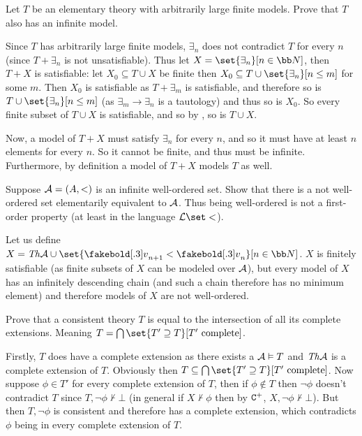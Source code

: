 \bexerc

    Let $T$ be an elementary theory with arbitrarily large finite models.
    Prove that $T$ also has an infinite model.

\eexerc

Since $T$ has arbitrarily large finite models, $\exists_n$ does not contradict $T$ for every $n$ (since $T+\exists_n$ is not unsatisfiable).
Thus let $X=\set{\exists_n}[n\in{\bb N}]$, then $T+X$ is satisfiable: let $X_0\subseteq T\cup X$ be finite then $X_0\subseteq T\cup\set{\exists_n}[n\leq m]$ for some $m$.
Then $X_0$ is satisfiable as $T+\exists_m$ is satisfiable, and therefore so is $T\cup\set{\exists_n}[n\leq m]$ (as $\exists_m\to\exists_n$ is a tautology) and thus so is $X_0$.
So every finite subset of $T\cup X$ is satisfiable, and so by , so is $T\cup X$.

Now, a model of $T+X$ must satisfy $\exists_n$ for every $n$, and so it must have at least $n$ elements for every $n$.
So it cannot be finite, and thus must be infinite.
Furthermore, by definition a model of $T+X$ models $T$ as well.

\bexerc

    Suppose ${\cal A}=(A,<)$ is an infinite well-ordered set.
    Show that there is a not well-ordered set elementarily equivalent to ${\cal A}$.
    Thus being well-ordered is not a first-order property (at least in the language ${\cal L}\set<$).

\eexerc

Let us define $X=\Th{\cal A}\cup\set{\v_{n+1}<\v_n}[n\in{\bb N}]$.
$X$ is finitely satisfiable (as finite subsets of $X$ can be modeled over ${\cal A}$), but every model of $X$ has an infinitely descending chain (and such a chain therefore has no minimum element) and
therefore models of $X$ are not well-ordered.

\bexerc

    Prove that a consistent theory $T$ is equal to the intersection of all its complete extensions.
    Meaning $T=\bigcap\set{T'\supseteq T}[T'\hbox{ complete}]$.

\eexerc

Firstly, $T$ does have a complete extension as there exists a ${\cal A}\vDash T$ and ${\it Th}{\cal A}$ is a complete extension of $T$.
Obviously then $T\subseteq\bigcap\set{T'\supseteq T}[T'\hbox{ complete}]$.
Now suppose $\phi\in T'$ for every complete extension of $T$, then if $\phi\notin T$ then $\neg\phi$ doesn't contradict $T$ since $T,\neg\phi\nvdash\bot$ (in general if $X\nvdash\phi$ then by ${\tt C}^+$,
$X,\neg\phi\nvdash\bot$).
But then $T,\neg\phi$ is consistent and therefore has a complete extension, which contradicts $\phi$ being in every complete extension of $T$.

